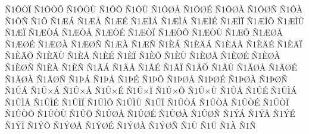 {^^d11^^d4^^d2^^cf
^^d11^^d4^^d2^^d5
^^d11^^d4^^d2^^d9
^^d11^^d4^^d5
^^d11^^d4^^d9
^^d11^^d4^^d8^^c5
^^d11^^d4^^d8^^c9
^^d11^^d4^^d8^^c0
^^d11^^d4^^d8^^d1
^^d11^^d4^^c0
^^d11^^d4^^d1
^^d11^^d5
^^d11^^c6^^c1
^^d11^^c6^^c5
^^d11^^c6^^c9
^^d11^^c6^^cc^^c1
^^d11^^c6^^cc^^c5
^^d11^^c6^^cc^^c9
^^d11^^c6^^cc^^cf
^^d11^^c6^^cc^^d5
^^d11^^c6^^cc^^d9
^^d11^^c6^^cf
^^d11^^c6^^d2^^c1
^^d11^^c6^^d2^^c5
^^d11^^c6^^d2^^c9
^^d11^^c6^^d2^^cf
^^d11^^c6^^d2^^d5
^^d11^^c6^^d2^^d9
^^d11^^c6^^d5
^^d11^^c6^^d8^^c5
^^d11^^c6^^d8^^c9
^^d11^^c6^^d8^^c0
^^d11^^c6^^d8^^d1
^^d11^^c6^^c0
^^d11^^c6^^d1
^^d11^^c8^^c1
^^d11^^c8^^c4^^c1
^^d11^^c8^^c4^^c5
^^d11^^c8^^c4^^c9
^^d11^^c8^^c4^^cf
^^d11^^c8^^c4^^d5
^^d11^^c8^^c4^^d9
^^d11^^c8^^c5
^^d11^^c8^^c9
^^d11^^c8^^cf
^^d11^^c8^^d5
^^d11^^c8^^d9
^^d11^^c8^^d8^^c5
^^d11^^c8^^d8^^c9
^^d11^^c8^^d8^^c0
^^d11^^c8^^d8^^d1
^^d11^^c8^^c0
^^d11^^c8^^d1
^^d11^^c3^^c1
^^d11^^c3^^c5
^^d11^^c3^^c9
^^d11^^c3^^cf
^^d11^^c3^^d5
^^d11^^c3^^d9
^^d11^^c3^^d8^^c5
^^d11^^c3^^d8^^c9
^^d11^^c3^^d8^^c0
^^d11^^c3^^d8^^d1
^^d11^^de^^c1
^^d11^^de^^c5
^^d11^^de^^c9
^^d11^^de^^d5
^^d11^^de^^d8^^c5
^^d11^^de^^d8^^c9
^^d11^^de^^d8^^c0
^^d11^^de^^d8^^d1
^^d11^^db^^c1
^^d11^^db^^d7^^c1
^^d11^^db^^d7^^c5
^^d11^^db^^d7^^c9
^^d11^^db^^d7^^cf
^^d11^^db^^d7^^d5
^^d11^^db^^d7^^d9
^^d11^^db^^c5
^^d11^^db^^c9
^^d11^^db^^cc^^c1
^^d11^^db^^cc^^c5
^^d11^^db^^cc^^c9
^^d11^^db^^cc^^cf
^^d11^^db^^cc^^d5
^^d11^^db^^cc^^d9
^^d11^^db^^cf
^^d11^^db^^d2^^c1
^^d11^^db^^d2^^c5
^^d11^^db^^d2^^c9
^^d11^^db^^d2^^cf
^^d11^^db^^d2^^d5
^^d11^^db^^d2^^d9
^^d11^^db^^d5
^^d11^^db^^d8^^c5
^^d11^^db^^d8^^c9
^^d11^^db^^d8^^c0
^^d11^^db^^d8^^d1
^^d11^^dd^^c1
^^d11^^dd^^c5
^^d11^^dd^^c9
^^d11^^dd^^cf
^^d11^^dd^^d5
^^d11^^dd^^d8^^c5
^^d11^^dd^^d8^^c9
^^d11^^dd^^d8^^c0
^^d11^^dd^^d8^^d1
^^d11^^d9
^^d11^^dc
^^d11^^c0
^^d11^^d1
}
